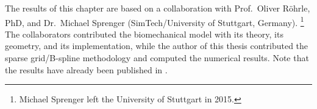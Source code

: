 The results of this chapter are based on a collaboration with
Prof.\ Oliver Röhrle, PhD, and Dr.\ Michael Sprenger
(SimTech/University of Stuttgart, Germany).%
\footnote{%
  Michael Sprenger left the University of Stuttgart in 2015.%
}
The collaborators contributed the biomechanical model
with its theory, its geometry, and its implementation,
while the author of this thesis contributed the
sparse grid/B-spline methodology and
computed the numerical results.
Note that the results have already been
published in \cite{Valentin18Gradient}.





\cleardoublepage
